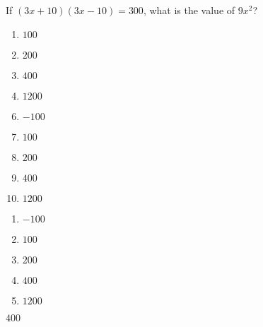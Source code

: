 If $(3x+10)(3x-10)=300$, what is the value of $9x^{2}$?


\ifsat
	\begin{enumerate}[label=\Alph*)]
		\item $100$
		\item $200$
		\item $400$%
		\item $1200$
	\end{enumerate}
\else
\fi

\ifacteven
	\begin{enumerate}[label=\textbf{\Alph*.},itemsep=\fill,align=left]
		\setcounter{enumii}{5}
		\item $-100$
		\item $100$
		\item $200$
		\addtocounter{enumii}{1}
		\item $400$%
		\item $1200$
	\end{enumerate}
\else
\fi

\ifactodd
	\begin{enumerate}[label=\textbf{\Alph*.},itemsep=\fill,align=left]
		\item $-100$
		\item $100$
		\item $200$
		\item $400$%
		\item $1200$
	\end{enumerate}
\else
\fi

\ifgridin
 $400$%
		
\else
\fi

